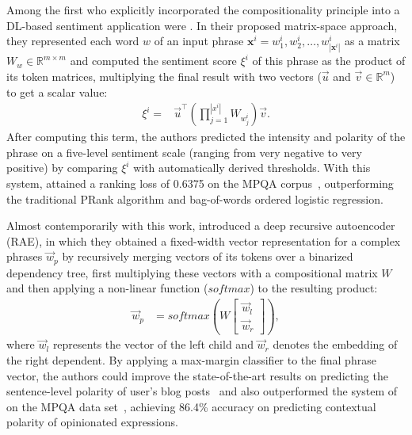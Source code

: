 Among the first who explicitly incorporated the compositionality
principle into a DL-based sentiment application were
\citet{Yessenalina:11}.  In their proposed matrix-space approach, they
represented each word $w$ of an input phrase $\mathbf{x}^i = w^i_1,
w^i_2, \ldots, w^i_{|\mathbf{x}^i|}$ as a matrix
$W_{w}\in\mathbb{R}^{m\times m}$ and computed the sentiment score
$\xi^i$ of this phrase as the product of its token matrices,
multiplying the final result with two vectors ($\vec{u}$ and
$\vec{v}\in\mathbb{R}^m$) to get a scalar value:
\begin{align*}
  \xi^i =& \vec{u}^\top\left(\prod_{j=1}^{|x^i|}W_{w^i_j}\right)\vec{v}.
\end{align*}
After computing this term, the authors predicted the intensity and
polarity of the phrase on a five-level sentiment scale (ranging from
very negative to very positive) by comparing $\xi^i$ with
automatically derived thresholds.  With this system,
\citeauthor{Yessenalina:11} attained a ranking loss of 0.6375 on the
MPQA corpus~\cite{Wiebe:05}, outperforming the traditional PRank
algorithm \cite{Crammer:01} and bag-of-words ordered logistic
regression.

Almost contemporarily with this work, \citet{Socher:11} introduced a
deep recursive autoencoder (RAE), in which they obtained a fixed-width
vector representation for a complex phrases $\vec{w}_p$ by recursively
merging vectors of its tokens over a binarized dependency tree, first
multiplying these vectors with a compositional matrix $W$ and then
applying a non-linear function ($softmax$) to the resulting product:
\begin{align}
  \vec{w}_p &= softmax\left(W\begin{bmatrix}
      \vec{w}_l\\
      \vec{w}_r
  \end{bmatrix}\right),\label{cgsa:eq:socher-11}
\end{align}
where $\vec{w}_l$ represents the vector of the left child and
$\vec{w}_r$ denotes the embedding of the right dependent.  By applying
a max-margin classifier to the final phrase vector, the authors could
improve the state-of-the-art results on predicting the sentence-level
polarity of user's blog posts~\cite{Potts:10} and also outperformed
the system of~\citet{Nasukawa:03} on the MPQA data
set~\cite{Wiebe:05}, achieving 86.4\% accuracy on predicting
contextual polarity of opinionated expressions.

